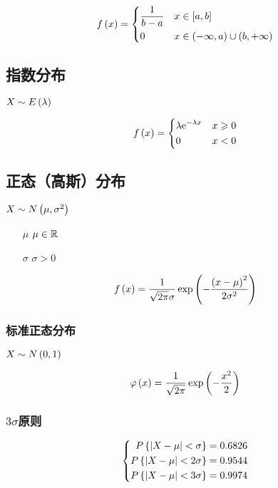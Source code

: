 \documentclass{article}
\begin{document}
\[f\left(x\right)=\left\{\begin{aligned}
         & \frac1{b-a} &  & x\in\left[a,b\right]               \\
         & 0           &  & x\in\left(-\infty,a\right)\cup\left(b,+\infty\right)
    \end{aligned}\right.\]

\subsection{指数分布}

$X\sim E\left(\lambda\right)$

\[f\left(x\right)=\left\{\begin{aligned}
         & \lambda\mathrm e^{-\lambda x} &  & x\geqslant0 \\
         & 0                      &  & x<0
    \end{aligned}\right.\]

\subsection{正态（高斯）分布}

$X\sim N\left(\mu,\sigma^2\right)$

\begin{enumerate}
    \item [$\mu$] $\mu\in\mathbb R$
    \item [$\sigma$] $\sigma>0$
\end{enumerate}

\[f\left(x\right)=\frac1{\sqrt{2\pi}\sigma}\exp\left(-\frac{{\left(x-\mu\right)}^2}{2\sigma^2}\right)\]

\subsubsection{标准正态分布}

$X\sim N\left(0,1\right)$

\[\varphi\left(x\right)=\frac1{\sqrt{2\pi}}\exp\left(-\frac{x^2}2\right)\]

\subsubsection{$3\sigma$原则}

\[\left\{\begin{aligned}
        P\left\{\left|X-\mu\right|<\sigma\right\}=0.6826  \\
        P\left\{\left|X-\mu\right|<2\sigma\right\}=0.9544 \\
        P\left\{\left|X-\mu\right|<3\sigma\right\}=0.9974
    \end{aligned}\right.\]
\end{document}
